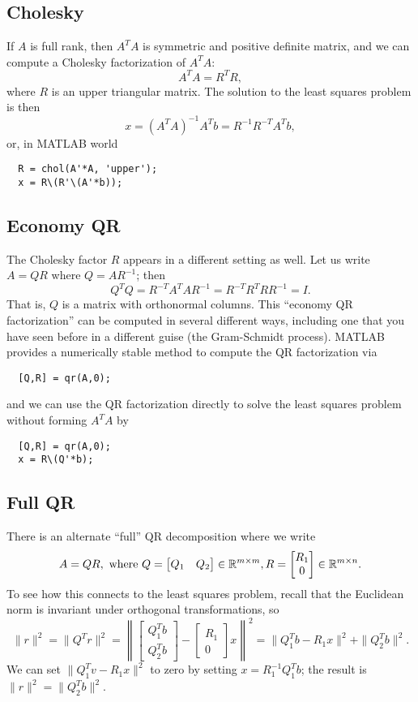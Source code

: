 \documentclass[12pt, leqno]{article} %
\begin{document}
\subsection{Cholesky}

If $A$ is full rank, then $A^T A$ is symmetric and positive definite
matrix, and we can compute a Cholesky factorization of $A^T A$:
\[
  A^T A = R^T R,
\]
where $R$ is an upper triangular matrix.
The solution to the least squares problem is then
\[
  x = (A^T A)^{-1} A^T b = R^{-1} R^{-T} A^T b,
\]
or, in MATLAB world
\begin{lstlisting}
  R = chol(A'*A, 'upper');
  x = R\(R'\(A'*b));
\end{lstlisting}

\subsection{Economy QR}

The Cholesky factor $R$ appears in a different setting as well.
Let us write $A = QR$ where $Q = AR^{-1}$; then
\[
  Q^T Q = R^{-T} A^T A R^{-1} = R^{-T} R^T R R^{-1} = I.
\]
That is, $Q$ is a matrix with orthonormal columns.  This
``economy QR factorization'' can be computed in several different
ways, including one that you have seen before in a different guise
(the Gram-Schmidt process).  MATLAB provides a numerically stable
method to compute the QR factorization via
\begin{lstlisting}
  [Q,R] = qr(A,0);
\end{lstlisting}
and we can use the QR factorization directly to solve the least
squares problem without forming $A^T A$ by
\begin{lstlisting}
  [Q,R] = qr(A,0);
  x = R\(Q'*b);
\end{lstlisting}

\subsection{Full QR}

There is an alternate ``full'' QR decomposition where we write
\[
A = QR, \mbox{ where }
Q = \begin{bmatrix} Q_1 & Q_2 \end{bmatrix} \in \mathbb{R}^{m \times m},
R = \begin{bmatrix} R_{1} \\ 0 \end{bmatrix} \in \mathbb{R}^{m \times n}.
\]
To see how this connects to the least squares problem, recall
that the Euclidean norm is invariant under orthogonal transformations,
so
\[
  \|r\|^2 = \|Q^T r\|^2 = \left\| \begin{bmatrix} Q_1^T b \\ Q_2^T
    b \end{bmatrix} - \begin{bmatrix} R_1 \\ 0 \end{bmatrix} x
  \right\|^2 = \|Q_1^T b-R_1x\|^2 + \|Q_2^T b\|^2.
\]
We can set $\|Q_1^T v-R_1 x\|^2$ to zero by
setting $x = R_1^{-1} Q_1^T b$; the result is
$\|r\|^2 = \|Q_2^T b\|^2$.
\end{document}

